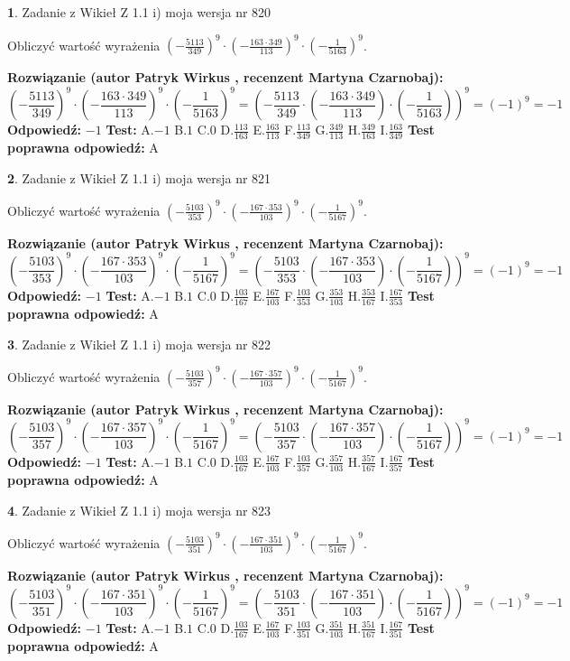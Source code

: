 \documentclass[12pt, a4paper]{article}
\theoremstyle{definition} %
\newtheorem{zad}{}
\newcommand{\zadStart}[1]{\begin{zad}#1\newline}
\newcommand{\zadStop}{\end{zad}}
\newcommand{\rozwStart}[2]{\noindent \textbf{Rozwiązanie (autor #1 , recenzent #2): }\newline}
\newcommand{\rozwStop}{\newline}
\newcommand{\odpStart}{\noindent \textbf{Odpowiedź:}\newline}
\newcommand{\odpStop}{\newline}
\newcommand{\testStart}{\noindent \textbf{Test:}\newline}
\newcommand{\testStop}{\newline}
\newcommand{\kluczStart}{\noindent \textbf{Test poprawna odpowiedź:}\newline}
\newcommand{\kluczStop}{\newline}
\begin{document}
\zadStart{Zadanie z Wikieł Z 1.1 i) moja wersja nr 820}

Obliczyć wartość wyrażenia $(-\frac{5113}{349})^{9} \cdot (-\frac{163 \cdot 349}{113})^{9} \cdot (-\frac{1}{5163})^{9}$.
\zadStop
\rozwStart{Patryk Wirkus}{Martyna Czarnobaj}
$$(-\frac{5113}{349})^{9} \cdot (-\frac{163 \cdot 349}{113})^{9} \cdot (-\frac{1}{5163})^{9} = (-\frac{5113}{349} \cdot (-\frac{163 \cdot 349}{113}) \cdot (-\frac{1}{5163}))^{9} = (-1)^{9} = -1$$
\rozwStop
\odpStart
$-1$
\odpStop
\testStart
A.$-1$ B.$1$ C.$0$ D.$\frac{113}{163}$ E.$\frac{163}{113}$
F.$\frac{113}{349}$ G.$\frac{349}{113}$
H.$\frac{349}{163}$
I.$\frac{163}{349}$
\testStop
\kluczStart
A
\kluczStop



\zadStart{Zadanie z Wikieł Z 1.1 i) moja wersja nr 821}

Obliczyć wartość wyrażenia $(-\frac{5103}{353})^{9} \cdot (-\frac{167 \cdot 353}{103})^{9} \cdot (-\frac{1}{5167})^{9}$.
\zadStop
\rozwStart{Patryk Wirkus}{Martyna Czarnobaj}
$$(-\frac{5103}{353})^{9} \cdot (-\frac{167 \cdot 353}{103})^{9} \cdot (-\frac{1}{5167})^{9} = (-\frac{5103}{353} \cdot (-\frac{167 \cdot 353}{103}) \cdot (-\frac{1}{5167}))^{9} = (-1)^{9} = -1$$
\rozwStop
\odpStart
$-1$
\odpStop
\testStart
A.$-1$ B.$1$ C.$0$ D.$\frac{103}{167}$ E.$\frac{167}{103}$
F.$\frac{103}{353}$ G.$\frac{353}{103}$
H.$\frac{353}{167}$
I.$\frac{167}{353}$
\testStop
\kluczStart
A
\kluczStop



\zadStart{Zadanie z Wikieł Z 1.1 i) moja wersja nr 822}

Obliczyć wartość wyrażenia $(-\frac{5103}{357})^{9} \cdot (-\frac{167 \cdot 357}{103})^{9} \cdot (-\frac{1}{5167})^{9}$.
\zadStop
\rozwStart{Patryk Wirkus}{Martyna Czarnobaj}
$$(-\frac{5103}{357})^{9} \cdot (-\frac{167 \cdot 357}{103})^{9} \cdot (-\frac{1}{5167})^{9} = (-\frac{5103}{357} \cdot (-\frac{167 \cdot 357}{103}) \cdot (-\frac{1}{5167}))^{9} = (-1)^{9} = -1$$
\rozwStop
\odpStart
$-1$
\odpStop
\testStart
A.$-1$ B.$1$ C.$0$ D.$\frac{103}{167}$ E.$\frac{167}{103}$
F.$\frac{103}{357}$ G.$\frac{357}{103}$
H.$\frac{357}{167}$
I.$\frac{167}{357}$
\testStop
\kluczStart
A
\kluczStop



\zadStart{Zadanie z Wikieł Z 1.1 i) moja wersja nr 823}

Obliczyć wartość wyrażenia $(-\frac{5103}{351})^{9} \cdot (-\frac{167 \cdot 351}{103})^{9} \cdot (-\frac{1}{5167})^{9}$.
\zadStop
\rozwStart{Patryk Wirkus}{Martyna Czarnobaj}
$$(-\frac{5103}{351})^{9} \cdot (-\frac{167 \cdot 351}{103})^{9} \cdot (-\frac{1}{5167})^{9} = (-\frac{5103}{351} \cdot (-\frac{167 \cdot 351}{103}) \cdot (-\frac{1}{5167}))^{9} = (-1)^{9} = -1$$
\rozwStop
\odpStart
$-1$
\odpStop
\testStart
A.$-1$ B.$1$ C.$0$ D.$\frac{103}{167}$ E.$\frac{167}{103}$
F.$\frac{103}{351}$ G.$\frac{351}{103}$
H.$\frac{351}{167}$
I.$\frac{167}{351}$
\testStop
\kluczStart
A
\kluczStop
\end{document}
